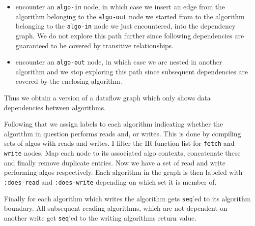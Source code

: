 \begin{itemize}
  \item encounter an \texttt{algo-in} node, in which case we insert an edge from the algorithm belonging to the \texttt{algo-out} node we started from to the algorithm belonging to the \texttt{algo-in} node we just encountered, into the dependency graph.
    We do not explore this path further since following dependencies are guaranteed to be covered by transitive relationships.
  \item encounter an \texttt{algo-out} node, in which case we are nested in another algorithm and we stop exploring this path since subsequent dependencies are covered by the enclosing algorithm.
\end{itemize}

Thus we obtain a version of a dataflow graph which only shows data dependencies between algorithms.

Following that we assign labels to each algorithm indicating whether the algorithm in question performs reads and, or writes.
This is done by compiling sets of algos with reads and writes.
I filter the IR function list for \texttt{fetch} and \texttt{write} nodes.
Map each node to its associated algo contexts, concatenate these and finally remove duplicate entries.
Now we have a set of read and write performing algos respectively.
Each algorithm in the graph is then labeled with \texttt{:does-read} and \texttt{:does-write} depending on which set it is member of.

Finally for each algorithm which writes the algorithm gets \texttt{seq}'ed to its algorithm boundary.
All subsequent reading algorithms, which are not dependent on another write get \texttt{seq}'ed to the writing algorithms return value.
